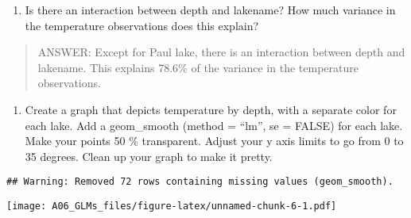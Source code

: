 \documentclass[]{article}
\newenvironment{Shaded}{\begin{snugshade}}{\end{snugshade}}
\newcommand{\KeywordTok}[1]{\textcolor[rgb]{0.13,0.29,0.53}{\textbf{#1}}}
\newcommand{\DataTypeTok}[1]{\textcolor[rgb]{0.13,0.29,0.53}{#1}}
\newcommand{\DecValTok}[1]{\textcolor[rgb]{0.00,0.00,0.81}{#1}}
\newcommand{\FloatTok}[1]{\textcolor[rgb]{0.00,0.00,0.81}{#1}}
\newcommand{\StringTok}[1]{\textcolor[rgb]{0.31,0.60,0.02}{#1}}
\newcommand{\CommentTok}[1]{\textcolor[rgb]{0.56,0.35,0.01}{\textit{#1}}}
\newcommand{\OtherTok}[1]{\textcolor[rgb]{0.56,0.35,0.01}{#1}}
\newcommand{\OperatorTok}[1]{\textcolor[rgb]{0.81,0.36,0.00}{\textbf{#1}}}
\newcommand{\NormalTok}[1]{#1}
\providecommand{\tightlist}{%
  \setlength{\itemsep}{0pt}\setlength{\parskip}{0pt}}
\begin{document}
\begin{enumerate}
\def\labelenumi{\arabic{enumi}.}
\setcounter{enumi}{14}
\tightlist
\item
  Is there an interaction between depth and lakename? How much variance
  in the temperature observations does this explain?
\end{enumerate}

\begin{quote}
ANSWER: Except for Paul lake, there is an interaction between depth and
lakename. This explains 78.6\% of the variance in the temperature
observations.
\end{quote}

\begin{enumerate}
\def\labelenumi{\arabic{enumi}.}
\setcounter{enumi}{15}
\tightlist
\item
  Create a graph that depicts temperature by depth, with a separate
  color for each lake. Add a geom\_smooth (method = ``lm'', se = FALSE)
  for each lake. Make your points 50 \% transparent. Adjust your y axis
  limits to go from 0 to 35 degrees. Clean up your graph to make it
  pretty.
\end{enumerate}

\begin{Shaded}
\end{Shaded}

\begin{verbatim}
## Warning: Removed 72 rows containing missing values (geom_smooth).
\end{verbatim}

\texttt{[image: A06\_GLMs\_files/figure-latex/unnamed-chunk-6-1.pdf]}
\end{document}
